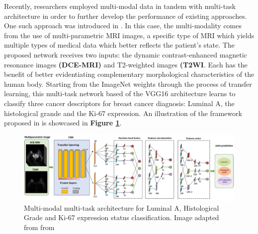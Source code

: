 Recently, researchers employed multi-modal data in tandem with multi-task architecture in order to further develop the performance of existing approaches. One such approach was introduced in \cite{fan2022framework}. In this case, the multi-modality comes from the use of multi-parametric MRI images, a specific type of MRI which yields multiple types of medical data which better reflects the patient's state. The proposed network receives two inputs: the dynamic contrast-enhanced magnetic resonance images \textbf{(DCE-MRI)} and T2-weighted images \textbf{(T2WI}. Each has the benefit of better evidentiating complementary morphological characteristics of the human body. Starting from the ImageNet weights through the process of transfer learning, this multi-task network based of the VGG16 \cite{simonyan2014very} architecture learns to classify three cancer descriptors for breast cancer diagnosis: Luminal A, the histological grande and the Ki-67 expression. An illustration of the framework proposed in \cite{fan2022framework} is showcased in \textbf{Figure \ref{multimodal_multitask}}.

\begin{figure}[htb]
    \centering
	\centerline{\includegraphics[scale=0.65]{figures/multimodal_multitask.png}}
	\caption{Multi-modal multi-task architecture for Luminal A, Histological Grade and Ki-67 expression status classification. Image adapted from from \cite{fan2022framework}}
	\label{multimodal_multitask}
\end{figure}

